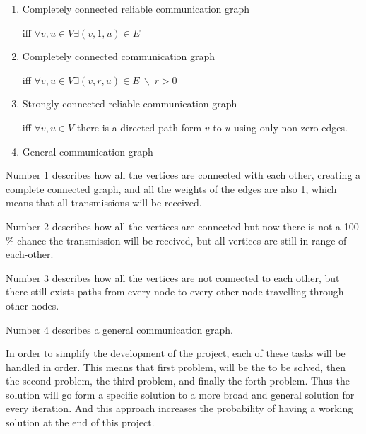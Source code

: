 \begin{enumerate}
    \item Completely connected reliable communication graph
    
    iff $\forall v, u \in V \exists (v,1,u)\in E$
    \item Completely connected communication graph
    
    iff $\forall v, u \in V \exists (v,r,u)\in E\: \backslash \; r>0$
    \item Strongly connected reliable communication graph
    
    iff $\forall v, u \in V $ there is a directed path form $v$ to $u$ using only non-zero edges.
    
    \item General communication graph
\end{enumerate}

Number 1 describes how all the vertices are connected with each other, creating a complete connected graph, and all the weights of the edges are also 1, which means that all transmissions will be received.

Number 2 describes how all the vertices are connected but now there is not a 100 \% chance the transmission will be received, but all vertices are still in range of each-other.

Number 3 describes how all the vertices are not connected to each other, but there still exists paths from every node to every other node travelling through other nodes.

Number 4 describes a general communication graph.

\bigskip \noindent
In order to simplify the development of the project, each of these tasks will be handled in order.
This means that first problem, will be the to be solved, then the second problem, the third problem, and finally the forth problem.
Thus the solution will go form a specific solution to a more broad and general solution for every iteration.
And this approach increases the probability of having a working solution at the end of this project.

